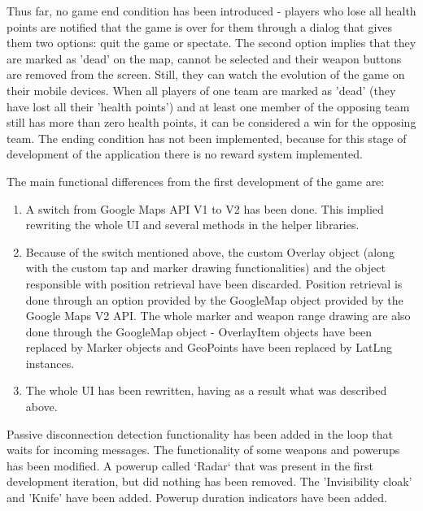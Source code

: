 Thus far, no game end condition has been introduced - players who lose all
health points are notified that the game is over for them through a dialog that
gives them two options: quit the game or spectate. The second option implies
that they are marked as 'dead' on the map, cannot be selected and their weapon
buttons are removed from the screen. Still, they can watch the evolution of the
game on their mobile devices. When all players of one team are marked as 'dead'
(they have lost all their 'health points') and at least one member of the
opposing team still has more than zero health points, it can be considered a win
for the opposing team. The ending condition has not been implemented, because
for this stage of development of the application there is no reward system
implemented. \newline

The main functional differences from the first development of the game are:

\begin{enumerate}
  \item A switch from Google Maps API V1 to V2 has been done. This implied
  rewriting the whole UI and several methods in the helper libraries.
  
  \item Because of the switch mentioned above, the custom Overlay object (along
  with the custom tap and marker drawing functionalities) and the object
  responsible with position retrieval have been discarded. Position retrieval is
  done through an option provided by the GoogleMap object provided by the Google
  Maps V2 API. The whole marker and weapon range drawing are also done through
  the GoogleMap object - OverlayItem objects have been replaced by Marker
  objects and GeoPoints have been replaced by LatLng instances.
  
  \item The whole UI has been rewritten, having as a result what was described
  above.  
  
\end{enumerate}

Passive disconnection detection functionality has been added in the loop that
waits for incoming messages. The functionality of some weapons and powerups has
been modified. A powerup called `Radar` that was present in the first
development iteration, but did nothing has been removed. The 'Invisibility
cloak' and 'Knife' have been added. Powerup duration indicators have been
added.\newline

